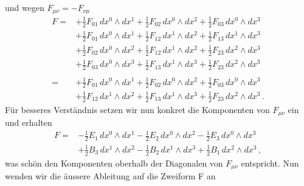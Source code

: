 und wegen $F_{\mu\nu} = -F_{\nu\mu}$
\begin{align*}
	F
	=
	&+ \frac{1}{2} F_{01} \, dx^0 \wedge dx^1 + \frac{1}{2} F_{02} \, dx^0 \wedge dx^2 + \frac{1}{2} F_{03} \, dx^0 \wedge dx^3
	\\
	&+ \frac{1}{2} F_{01} \, dx^0 \wedge dx^1 + \frac{1}{2} F_{12} \, dx^1 \wedge dx^2 + \frac{1}{2} F_{13} \, dx^1 \wedge dx^3
	\\
	&+ \frac{1}{2} F_{02} \, dx^0 \wedge dx^2 + \frac{1}{2} F_{12} \, dx^1 \wedge dx^2 + \frac{1}{2} F_{23} \, dx^2 \wedge dx^3
	\\
	&+ \frac{1}{2} F_{03} \, dx^0 \wedge dx^3 + \frac{1}{2} F_{13} \, dx^1 \wedge dx^3 + \frac{1}{2} F_{23} \, dx^2 \wedge dx^3
	\\
	\\
	=
	&+ \frac{1}{2} F_{01} \, dx^0 \wedge dx^1 + \frac{1}{2} F_{02} \, dx^0 \wedge dx^2 + \frac{1}{2} F_{03} \, dx^0 \wedge dx^3
	\\
	&+ \frac{1}{2} F_{12} \, dx^1 \wedge dx^2 + \frac{1}{2} F_{13} \, dx^1 \wedge dx^3 + \frac{1}{2} F_{23} \, dx^2 \wedge dx^3 \, .
\end{align*}
Für besseres Verständnis setzen wir nun konkret die Komponenten von $F_{\mu\nu}$ ein und erhalten
 \begin{align*}
 	F
 	=
 	&- \frac{1}{2} E_1 \, dx^0 \wedge dx^1 - \frac{1}{2} E_2 \, dx^0 \wedge dx^2 - \frac{1}{2} E_3 \, dx^0 \wedge dx^3
 	\\
 	&+ \frac{1}{2} B_3 \, dx^1 \wedge dx^2 - \frac{1}{2} B_2 \, dx^1 \wedge dx^3 + \frac{1}{2} B_1 \, dx^2 \wedge dx^3 \, ,
 \end{align*}
was schön den Komponenten oberhalb der Diagonalen von $F_{\mu\nu}$ entspricht.
Nun wenden wir die äussere Ableitung auf die Zweiform F an
